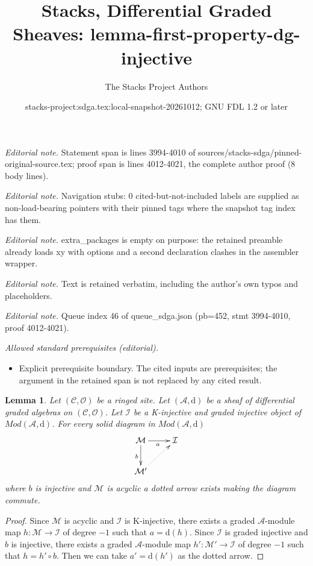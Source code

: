 \documentclass[10pt,a4paper]{amsart}
\title{Stacks, Differential Graded Sheaves: lemma-first-property-dg-injective}
\author{The Stacks Project Authors}
\date{stacks-project:sdga.tex:local-snapshot-20261012; GNU FDL 1.2 or later}
\theoremstyle{plain}
\newtheorem{lemma}[subsection]{Lemma}
\theoremstyle{definition}
\theoremstyle{remark}
\numberwithin{equation}{subsection}
\begin{document}
\maketitle
\noindent\textit{Editorial note.} Statement span is lines 3994-4010 of sources/stacks-sdga/pinned-original-source.tex; proof span is lines 4012-4021, the complete author proof (8 body lines).\par\medskip
\noindent\textit{Editorial note.} Navigation stubs: 0 cited-but-not-included labels are supplied as non-load-bearing pointers with their pinned tags where the snapshot tag index has them.\par\medskip
\noindent\textit{Editorial note.} extra\_packages is empty on purpose: the retained preamble already loads xy with options and a second declaration clashes in the assembler wrapper.\par\medskip
\noindent\textit{Editorial note.} Text is retained verbatim, including the author's own typos and placeholders.\par\medskip
\noindent\textit{Editorial note.} Queue index 46 of queue\_sdga.json (pb=452, stmt 3994-4010, proof 4012-4021).\par\medskip
\noindent\textit{Allowed standard prerequisites (editorial).}\begin{itemize}
\item Explicit prerequisite boundary. The cited inputs are prerequisites; the argument in the retained span is not replaced by any cited result.
\end{itemize}\medskip
\begin{lemma}
\label{lemma-first-property-dg-injective}
Let $(\mathcal{C}, \mathcal{O})$ be a ringed site.
Let $(\mathcal{A}, \text{d})$
be a sheaf of differential graded algebras on $(\mathcal{C}, \mathcal{O})$.
Let $\mathcal{I}$ be a K-injective and graded injective
object of $\textit{Mod}(\mathcal{A}, \text{d})$.
For every solid diagram in $\textit{Mod}(\mathcal{A}, \text{d})$
$$
\xymatrix{
\mathcal{M} \ar[r]_a \ar[d]_b & \mathcal{I} \\
\mathcal{M}' \ar@{..>}[ru]
}
$$
where $b$ is injective and $\mathcal{M}$ is acyclic
a dotted arrow exists making the diagram commute.
\end{lemma}

\begin{proof}
Since $\mathcal{M}$ is acyclic and $\mathcal{I}$ is K-injective,
there exists a graded $\mathcal{A}$-module map
$h : \mathcal{M} \to \mathcal{I}$ of degree $-1$
such that $a = \text{d}(h)$. Since $\mathcal{I}$ is graded injective
and $b$ is injective, there exists a graded $\mathcal{A}$-module
map $h' : \mathcal{M}' \to \mathcal{I}$ of degree $-1$
such that $h = h' \circ b$. Then we can take $a' = \text{d}(h')$
as the dotted arrow.
\end{proof}
\end{document}
